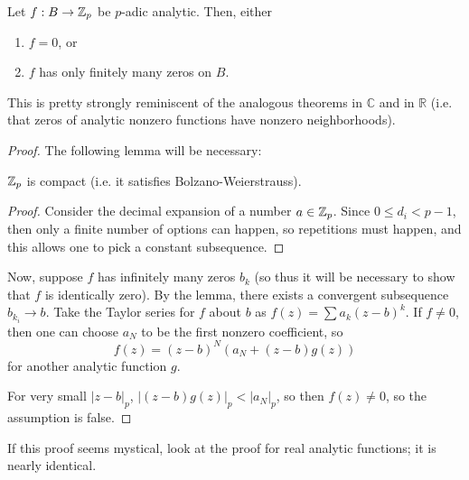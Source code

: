 \begin{thm}[Straussman]
Let $f:B\to\mathbb{Z}_p$ be $p$-adic analytic. Then, either
\begin{enumerate}
\item $f = 0$, or
\item $f$ has only finitely many zeros on $B$.
\end{enumerate}
\end{thm}
This is pretty strongly reminiscent of the analogous theorems in $\mathbb{C}$ and in $\mathbb{R}$ (i.e. that zeros of analytic nonzero functions have nonzero neighborhoods).
\begin{proof} The following lemma will be necessary:
\begin{lem}
$\mathbb{Z}_p$ is compact (i.e. it satisfies Bolzano-Weierstrauss).
\end{lem}
\begin{proof}
Consider the decimal expansion of a number $a\in\mathbb{Z}_p$. Since $0 \le d_i < p-1$, then only a finite number of options can happen, so repetitions must happen, and this allows one to pick a constant subsequence.
\end{proof}
Now, suppose $f$ has infinitely many zeros $b_k$ (so thus it will be necessary to show that $f$ is identically zero). By the lemma, there exists a convergent subsequence $b_{k_i}\to b$. Take the Taylor series for $f$ about $b$ as $f(z) =\sum a_k (z-b)^k$. If $f\ne 0$, then one can choose $a_N$ to be the first nonzero coefficient, so
\[f(z) = (z-b)^N(a_N+(z-b)g(z))\]
for another analytic function $g$.

For very small $|z-b|_p$, $|(z-b)g(z)|_p < |a_N|_p$, so then $f(z)\ne 0$, so the assumption is false.
\end{proof}
If this proof seems mystical, look at the proof for real analytic functions; it is nearly identical.
